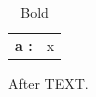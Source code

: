 \documentclass{article}
\begin{document}
\begin{longtable}{>{\bfseries}l<{:}l}
\caption{Bold} \\
a & x \\
\end{longtable}
After TEXT.
\end{document}
